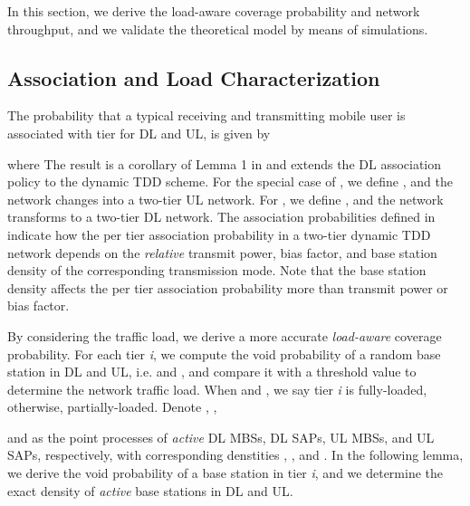 \documentclass[twocolumn,english]{IEEEtran}
\theoremstyle{plain}
\theoremstyle{definition}
\begin{document}
In this section, we derive the load-aware coverage probability and
network throughput, and we validate the theoretical model by means
of simulations.


\subsection{Association and Load Characterization}

The probability that a typical receiving and transmitting mobile user
is associated with tier  for DL and UL, is given by

where 
The result is a corollary of Lemma 1 in \cite{HCNW} and extends the
DL association policy to the dynamic TDD scheme. For the special case
of , we define ,
and the network changes into a two-tier UL network. For ,
we define ,
and the network transforms to a two-tier DL network. The association
probabilities defined in  indicate how the
per tier association probability in a two-tier dynamic TDD network
depends on the \emph{relative} transmit power, bias factor, and base
station density of the corresponding transmission mode. Note that
the base station density affects the per tier association probability
more than transmit power or bias factor.

By considering the traffic load, we derive a more accurate \emph{load-aware}
coverage probability. For each tier \emph{i}, we compute the void
probability of a random base station in DL and UL, i.e. 
and , and compare
it with a threshold value to determine the network traffic load. When
 and ,
we say tier \emph{i} is fully-loaded, otherwise, partially-loaded.
Denote ,
,

and 
as the point processes of \emph{active} DL MBSs, DL SAPs, UL MBSs,
and UL SAPs, respectively, with corresponding denstities ,
, 
and . In the following lemma,
we derive the void probability of a base station in tier \emph{i},
and we determine the exact density of \emph{active} base stations
in DL and UL.
\end{document}
